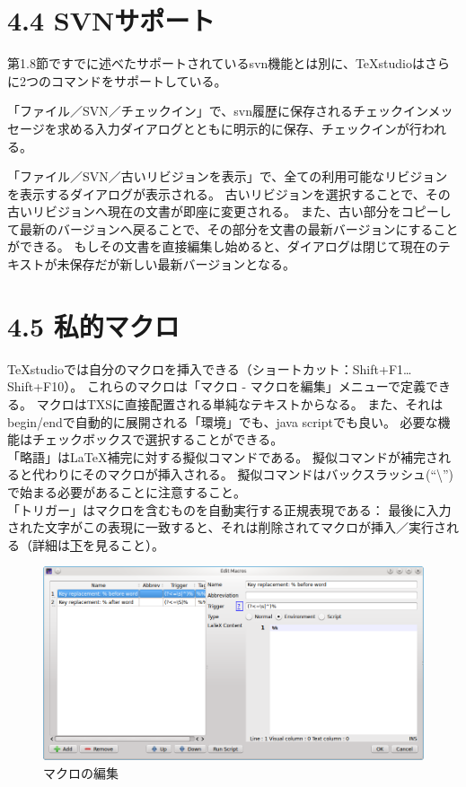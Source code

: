 \documentclass[]{book}
\makeatletter
\def\maxwidth{\ifdim\Gin@nat@width>\linewidth\linewidth
\else\Gin@nat@width\fi}
\let\Oldincludegraphics\includegraphics
\renewcommand{\includegraphics}[1]{\Oldincludegraphics[width=\maxwidth]{#1}}
\makeatother
\begin{document}
\section{4.4 SVNサポート}

第1.8節ですでに述べたサポートされているsvn機能とは別に、TeXstudioはさらに2つのコマンドをサポートしている。

「ファイル／SVN／チェックイン」で、svn履歴に保存されるチェックインメッセージを求める入力ダイアログとともに明示的に保存、チェックインが行われる。

「ファイル／SVN／古いリビジョンを表示」で、全ての利用可能なリビジョンを表示するダイアログが表示される。
古いリビジョンを選択することで、その古いリビジョンへ現在の文書が即座に変更される。
また、古い部分をコピーして最新のバージョンへ戻ることで、その部分を文書の最新バージョンにすることができる。
もしその文書を直接編集し始めると、ダイアログは閉じて現在のテキストが未保存だが新しい最新バージョンとなる。

\section{4.5 私的マクロ}

TeXstudioでは自分のマクロを挿入できる（ショートカット：Shift+F1\ldots{}Shift+F10）。
これらのマクロは「マクロ - マクロを編集」メニューで定義できる。
マクロはTXSに直接配置される単純なテキストからなる。
また、それはbegin/endで自動的に展開される「環境」でも、java
scriptでも良い。 必要な機能はチェックボックスで選択することができる。\\
「略語」はLaTeX補完に対する擬似コマンドである。
擬似コマンドが補完されると代わりにそのマクロが挿入される。
擬似コマンドはバックスラッシュ(``\textbackslash{}'')で始まる必要があることに注意すること。\\
「トリガー」はマクロを含むものを自動実行する正規表現である：
最後に入力された文字がこの表現に一致すると、それは削除されてマクロが挿入／実行される（詳細は\hyperref[sectionTriggers]{下}を見ること）。

\begin{figure}[htbp]
\centering
\includegraphics{doc17.png}
\caption{マクロの編集}
\end{figure}
\end{document}
